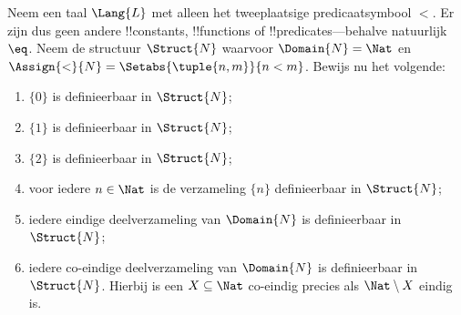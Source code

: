 \documentclass[../../../include/open-logic-section]{subfiles}
\begin{document}
\begin{prob}
Neem een taal $\Lang{L}$ met alleen het tweeplaatsige predicaatsymbool
$<$. Er zijn dus geen andere !!{constant}s, !!{function}s of
!!{predicate}s---behalve natuurlijk~$\eq$. Neem de structuur
$\Struct{N}$ waarvoor $\Domain{N} = \Nat$ en
$\Assign{<}{N} = \Setabs{\tuple{n,m}}{n < m}$. Bewijs nu het volgende:
\begin{enumerate}
\item $\{ 0 \}$ is definieerbaar in $\Struct{N}$;
\item $\{ 1 \}$ is definieerbaar in $\Struct{N}$;
\item $\{ 2 \}$ is definieerbaar in $\Struct{N}$;
\item voor iedere $n \in \Nat$ is de verzameling $\{ n \}$
  definieerbaar in $\Struct{N}$;
\item iedere eindige deelverzameling van $\Domain{N}$ is definieerbaar
  in $\Struct{N}$;
\item iedere co-eindige deelverzameling van $\Domain{N}$ is
  definieerbaar in $\Struct{N}$. Hierbij is een $X \subseteq \Nat$
  co-eindig precies als $\Nat \setminus X$ eindig is.
\end{enumerate}
\end{prob}
\end{document}
